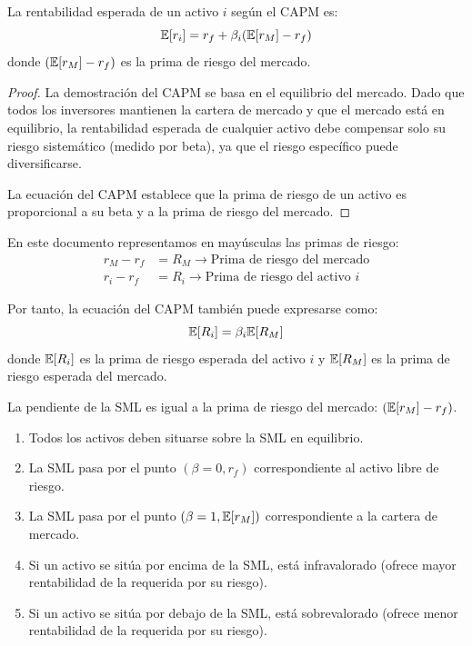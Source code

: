 \begin{teorema}
La rentabilidad esperada de un activo $i$ según el CAPM es:
\begin{equation}
\mathbb{E}[r_i] = r_f + \beta_i (\mathbb{E}[r_M] - r_f)
\end{equation}
donde $(\mathbb{E}[r_M] - r_f)$ es la prima de riesgo del mercado.
\end{teorema}

\begin{proof}
La demostración del CAPM se basa en el equilibrio del mercado. Dado que todos los inversores mantienen la cartera de mercado y que el mercado está en equilibrio, la rentabilidad esperada de cualquier activo debe compensar solo su riesgo sistemático (medido por beta), ya que el riesgo específico puede diversificarse.

La ecuación del CAPM establece que la prima de riesgo de un activo es proporcional a su beta y a la prima de riesgo del mercado.
\end{proof}

En este documento representamos en mayúsculas las primas de riesgo:
\begin{align}
r_M - r_f &= R_M \rightarrow \text{Prima de riesgo del mercado} \\
r_i - r_f &= R_i \rightarrow \text{Prima de riesgo del activo } i
\end{align}

Por tanto, la ecuación del CAPM también puede expresarse como:
\begin{equation}
\mathbb{E}[R_i] = \beta_i \mathbb{E}[R_M]
\end{equation}
donde $\mathbb{E}[R_i]$ es la prima de riesgo esperada del activo $i$ y $\mathbb{E}[R_M]$ es la prima de riesgo esperada del mercado.

La pendiente de la SML es igual a la prima de riesgo del mercado: $(\mathbb{E}[r_M] - r_f)$.

\begin{proposicion}
\begin{enumerate}
\item Todos los activos deben situarse sobre la SML en equilibrio.
\item La SML pasa por el punto $(\beta = 0, r_f)$ correspondiente al activo libre de riesgo.
\item La SML pasa por el punto $(\beta = 1, \mathbb{E}[r_M])$ correspondiente a la cartera de mercado.
\item Si un activo se sitúa por encima de la SML, está infravalorado (ofrece mayor rentabilidad de la requerida por su riesgo).
\item Si un activo se sitúa por debajo de la SML, está sobrevalorado (ofrece menor rentabilidad de la requerida por su riesgo).
\end{enumerate}
\end{proposicion}

